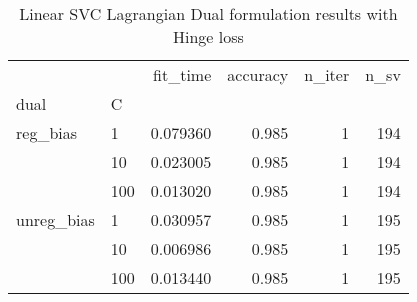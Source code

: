 \begin{table}[H]
\centering
\caption{Linear SVC Lagrangian Dual formulation results with Hinge loss}
\label{linear_lagrangian_dual_l1_svc_cv_results}
\begin{tabular}{llrrrr}
\toprule
           &     &  fit\_time &  accuracy &  n\_iter &  n\_sv \\
dual & C &           &           &         &       \\
\midrule
reg\_bias & 1   &  0.079360 &     0.985 &       1 &   194 \\
           & 10  &  0.023005 &     0.985 &       1 &   194 \\
           & 100 &  0.013020 &     0.985 &       1 &   194 \\
unreg\_bias & 1   &  0.030957 &     0.985 &       1 &   195 \\
           & 10  &  0.006986 &     0.985 &       1 &   195 \\
           & 100 &  0.013440 &     0.985 &       1 &   195 \\
\bottomrule
\end{tabular}
\end{table}

